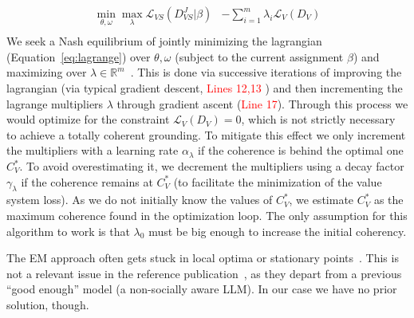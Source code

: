 \documentclass{ecai}
\newcommand{\R}{\mathbb{R}}
\begin{document}
\begin{align}\label{eq:lagrange}
    \min_{\theta,\omega} \max_\lambda\mathcal{L}_{VS}(D_{VS}^J|\beta) &- \sum_{i=1}^m\lambda_i \mathcal{L}_V(D_V)\\
\end{align}
We seek a Nash equilibrium of jointly minimizing the lagrangian  (Equation~\ref{eq:lagrange}) over $\theta,\omega$ (subject to the current assignment $\beta$) and maximizing over $\lambda \in \R^m$~\cite{pmlrv98cotter19aLagrangianNash}. This is done via successive iterations of improving the lagrangian (via typical gradient descent,\textcolor{red}{ Lines 12,13 }) and then incrementing the lagrange multipliers $\lambda$ through gradient ascent (\textcolor{red}{Line 17}). Through this process we would optimize for the constraint $\mathcal{L}_V(D_V) = 0$, which is not strictly necessary to achieve a totally coherent grounding. To mitigate this effect we only increment the multipliers with a learning rate $\alpha_\lambda$ if the coherence is behind the optimal one  $C^*_V$. To avoid overestimating it, we decrement the multipliers using a decay factor $\gamma_\lambda$ if the coherence remains at $C_V^*$ (to facilitate the minimization of the value system loss). As we do not initially know the values of $C^*_V$, we estimate $C_V^*$ as the maximum coherence found in the optimization loop. The only assumption for this algorithm to work is that $\lambda_0$ must be big enough to increase the initial coherency.


The EM approach often gets stuck in local optima or stationary points~\cite{emlocalconvergence}. This is not a relevant issue in the reference publication~\cite{pmlr-v235-chakraborty24b}, as they depart from a previous ``good enough'' model (a non-socially aware LLM). In our case we have no prior solution, though.
\end{document}
